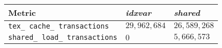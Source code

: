 \begin{table}
	\begin{center}
    \begin{tabular}{l l l}
        \hline
        \textbf{Metric} & \textbf{\emph{idxvar}} & \textbf{\emph{shared}} \\
        \hline
        \hline
        \texttt{tex\_ cache\_ transactions} & $29,962,684$ & $26,589,268$ \\
        \texttt{shared\_ load\_ transactions} & $0$ & $5,666,573$ \\

\end{tabular}
\end{center}
\end{table}
